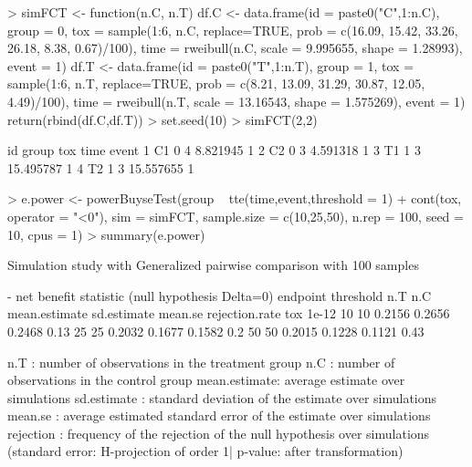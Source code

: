 \documentclass[12pt]{article}
\theoremstyle{definition}
\begin{document}
\begin{Rcode}
> simFCT <- function(n.C, n.T){
   df.C <- data.frame(id = paste0("C",1:n.C), group = 0,
                      tox = sample(1:6, n.C, replace=TRUE, 
                                   prob = c(16.09, 15.42, 33.26, 26.18, 8.38, 0.67)/100),                       
                      time = rweibull(n.C, scale = 9.995655, shape = 1.28993),
                      event = 1)
   df.T <- data.frame(id = paste0("T",1:n.T), group = 1,
                      tox = sample(1:6, n.T, replace=TRUE, 
                                   prob = c(8.21, 13.09, 31.29, 30.87, 12.05, 4.49)/100),                       
                      time = rweibull(n.T, scale = 13.16543, shape = 1.575269),
                      event = 1)
   return(rbind(df.C,df.T))
}
> set.seed(10)
> simFCT(2,2)
\end{Rcode}
\begin{Routput}
  id group tox      time event
1 C1     0   4  8.821945     1
2 C2     0   3  4.591318     1
3 T1     1   3 15.495787     1
4 T2     1   3 15.557655     1
\end{Routput}

\begin{Rcode}
> e.power <- powerBuyseTest(group ~ tte(time,event,threshold = 1)  + cont(tox, operator = "<0"),
                           sim = simFCT, sample.size = c(10,25,50),
                           n.rep = 100, seed = 10, cpus = 1)
> summary(e.power)
\end{Rcode}

\begin{Routput}
        Simulation study with Generalized pairwise comparison with 100 samples

- net benefit statistic (null hypothesis Delta=0)
endpoint threshold n.T n.C mean.estimate sd.estimate mean.se rejection.rate
     tox     1e-12  10  10        0.2156      0.2656  0.2468           0.13
                    25  25        0.2032      0.1677  0.1582            0.2
                    50  50        0.2015      0.1228  0.1121           0.43

n.T          : number of observations in the treatment group
n.C          : number of observations in the control group
mean.estimate: average estimate over simulations
sd.estimate  : standard deviation of the estimate over simulations
mean.se      : average estimated standard error of the estimate over simulations
rejection    : frequency of the rejection of the null hypothesis over simulations
(standard error: H-projection of order 1| p-value: after transformation) 
\end{Routput}
\end{document}
